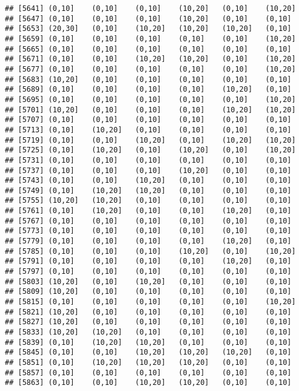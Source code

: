 \documentclass[]{article}
\begin{document}
\begin{verbatim}
## [5641] (0,10]    (0,10]    (0,10]    (10,20]   (0,10]    (10,20]  
## [5647] (0,10]    (0,10]    (0,10]    (10,20]   (0,10]    (0,10]   
## [5653] (20,30]   (0,10]    (10,20]   (10,20]   (10,20]   (0,10]   
## [5659] (0,10]    (0,10]    (0,10]    (0,10]    (0,10]    (10,20]  
## [5665] (0,10]    (0,10]    (0,10]    (0,10]    (0,10]    (0,10]   
## [5671] (0,10]    (0,10]    (10,20]   (10,20]   (0,10]    (10,20]  
## [5677] (0,10]    (0,10]    (0,10]    (0,10]    (0,10]    (10,20]  
## [5683] (10,20]   (0,10]    (0,10]    (0,10]    (0,10]    (0,10]   
## [5689] (0,10]    (0,10]    (0,10]    (0,10]    (10,20]   (0,10]   
## [5695] (0,10]    (0,10]    (0,10]    (0,10]    (0,10]    (10,20]  
## [5701] (10,20]   (0,10]    (0,10]    (0,10]    (10,20]   (10,20]  
## [5707] (0,10]    (0,10]    (0,10]    (0,10]    (0,10]    (0,10]   
## [5713] (0,10]    (10,20]   (0,10]    (0,10]    (0,10]    (0,10]   
## [5719] (0,10]    (0,10]    (10,20]   (0,10]    (10,20]   (10,20]  
## [5725] (0,10]    (10,20]   (0,10]    (10,20]   (0,10]    (10,20]  
## [5731] (0,10]    (0,10]    (0,10]    (0,10]    (0,10]    (0,10]   
## [5737] (0,10]    (0,10]    (0,10]    (10,20]   (0,10]    (0,10]   
## [5743] (0,10]    (0,10]    (10,20]   (0,10]    (0,10]    (0,10]   
## [5749] (0,10]    (10,20]   (10,20]   (0,10]    (0,10]    (0,10]   
## [5755] (10,20]   (10,20]   (0,10]    (0,10]    (0,10]    (0,10]   
## [5761] (0,10]    (10,20]   (0,10]    (0,10]    (10,20]   (0,10]   
## [5767] (0,10]    (0,10]    (0,10]    (0,10]    (0,10]    (0,10]   
## [5773] (0,10]    (0,10]    (0,10]    (0,10]    (0,10]    (0,10]   
## [5779] (0,10]    (0,10]    (0,10]    (0,10]    (10,20]   (0,10]   
## [5785] (0,10]    (0,10]    (0,10]    (10,20]   (0,10]    (10,20]  
## [5791] (0,10]    (0,10]    (0,10]    (0,10]    (10,20]   (0,10]   
## [5797] (0,10]    (0,10]    (0,10]    (0,10]    (0,10]    (0,10]   
## [5803] (10,20]   (0,10]    (10,20]   (0,10]    (0,10]    (0,10]   
## [5809] (10,20]   (0,10]    (0,10]    (0,10]    (0,10]    (0,10]   
## [5815] (0,10]    (0,10]    (0,10]    (0,10]    (0,10]    (10,20]  
## [5821] (10,20]   (0,10]    (0,10]    (0,10]    (0,10]    (0,10]   
## [5827] (10,20]   (0,10]    (0,10]    (0,10]    (0,10]    (0,10]   
## [5833] (10,20]   (10,20]   (0,10]    (0,10]    (0,10]    (0,10]   
## [5839] (0,10]    (10,20]   (10,20]   (0,10]    (0,10]    (0,10]   
## [5845] (0,10]    (0,10]    (10,20]   (10,20]   (10,20]   (0,10]   
## [5851] (0,10]    (10,20]   (10,20]   (10,20]   (0,10]    (0,10]   
## [5857] (0,10]    (0,10]    (0,10]    (0,10]    (0,10]    (0,10]   
## [5863] (0,10]    (0,10]    (10,20]   (10,20]   (0,10]    (0,10]   

\end{verbatim}
\end{document}
